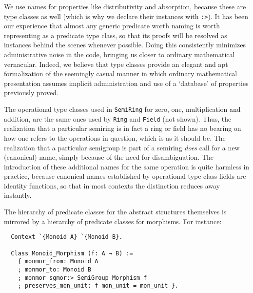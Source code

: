 \documentclass[a4paper,10pt,runningheads]{llncs}
\begin{document}

We use names for properties like distributivity and absorption, because these are type classes as well (which is why we declare their instances with \lstinline|:>|). It has been our experience that almost any generic predicate worth naming is worth representing as a predicate type class, so that its proofs will be resolved as instances behind the scenes whenever possible. Doing this consistently minimizes administrative noise in the code, bringing us closer to ordinary mathematical vernacular. Indeed, we believe that type classes provide an elegant and apt formalization of the seemingly casual manner in which ordinary mathematical presentation assumes implicit administration and use of a `database' of properties previously proved.

The operational type classes used in \lstinline|SemiRing| for zero, one, multiplication and addition, are the same ones used by \lstinline|Ring| and \lstinline|Field| (not shown). Thus, the realization that a particular semiring is in fact a ring or field has no bearing on how one refers to the operations in question, which is as it should be. The realization that a particular semigroup is part of a semiring \emph{does} call for a new (canonical) name, simply because of the need for disambiguation. The introduction of these additional names for the same operation is quite harmless in practice, because canonical names established by operational type class fields are identity functions, so that in most contexts the distinction reduces away instantly.

The hierarchy of predicate classes for the abstract structures themselves is mirrored by a hierarchy of predicate classes for morphisms. For instance:
\begin{lstlisting}
  Context `{Monoid A} `{Monoid B}.

  Class Monoid_Morphism (f: A → B) :=
    { monmor_from: Monoid A
    ; monmor_to: Monoid B
    ; monmor_sgmor:> SemiGroup_Morphism f
    ; preserves_mon_unit: f mon_unit = mon_unit }.
\end{lstlisting}
\end{document}
